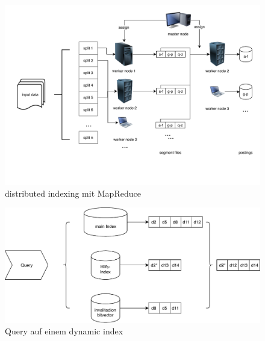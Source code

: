\begin{figure}[hb]
  \includegraphics[width=\textwidth]{pdf/distributedIndexAll.pdf}
  \caption{distributed indexing mit MapReduce}
  \label{distribIndex}
\end{figure}

\begin{figure}[hb]
  \includegraphics[width=\textwidth]{pdf/dynamicindex.pdf}
  \caption{Query auf einem dynamic index}
  \label{dynIndex}
\end{figure}
